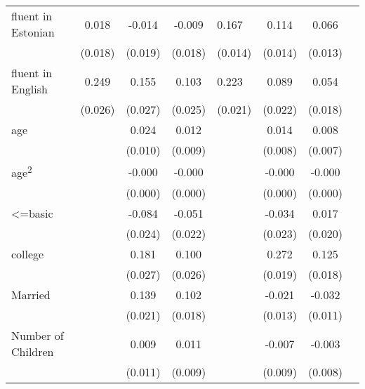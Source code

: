 \begin{longtable}{l*{3}{c}|l*{3}{c}}
	
	fluent in Estonian  &       0.018         &      -0.014         &      -0.009         &       0.167\sym{***}&       0.114\sym{***}&       0.066\sym{***}\\
	&     (0.018)         &     (0.019)         &     (0.018)         &     (0.014)         &     (0.014)         &     (0.013)         \\
	fluent in English   &       0.249\sym{***}&       0.155\sym{***}&       0.103\sym{***}&       0.223\sym{***}&       0.089\sym{***}&       0.054\sym{***}\\
	&     (0.026)         &     (0.027)         &     (0.025)         &     (0.021)         &     (0.022)         &     (0.018)         \\
	age                 &                     &       0.024\sym{**} &       0.012         &                     &       0.014\sym{*}  &       0.008         \\
	&                     &     (0.010)         &     (0.009)         &                     &     (0.008)         &     (0.007)         \\
	age\textsuperscript{2}    &                     &      -0.000\sym{***}&      -0.000\sym{*}  &                     &      -0.000\sym{**} &      -0.000         \\
	&                     &     (0.000)         &     (0.000)         &                     &     (0.000)         &     (0.000)         \\
	<=basic             &                     &      -0.084\sym{***}&      -0.051\sym{**} &                     &      -0.034         &       0.017         \\
	&                     &     (0.024)         &     (0.022)         &                     &     (0.023)         &     (0.020)         \\
	college             &                     &       0.181\sym{***}&       0.100\sym{***}&                     &       0.272\sym{***}&       0.125\sym{***}\\
	&                     &     (0.027)         &     (0.026)         &                     &     (0.019)         &     (0.018)         \\
	Married             &                     &       0.139\sym{***}&       0.102\sym{***}&                     &      -0.021         &      -0.032\sym{***}\\
	&                     &     (0.021)         &     (0.018)         &                     &     (0.013)         &     (0.011)         \\
	Number of Children  &                     &       0.009         &       0.011         &                     &      -0.007         &      -0.003         \\
	&                     &     (0.011)         &     (0.009)         &                     &     (0.009)         &     (0.008)         \\


\end{longtable}
